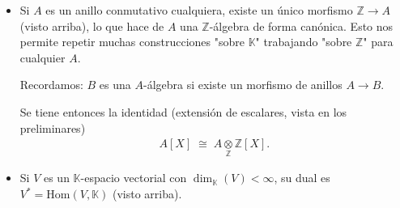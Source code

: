 \begin{ejemplo}
\begin{itemize}
        Tomemos ahora $X=\mathbb{N}$. Dentro de $\mathrm{Maps}(\mathbb{N},\mathbb{K})=\mathbb{K}^{\mathbb{N}}$ (todas las sucesiones) tenemos el subconjunto $\mathbb{K}^{(\mathbb{N})}$ de \textbf{soporte finito} (sucesiones casi nulas), que es un ideal de $\mathbb{K}^{\mathbb{N}}$ pero \emph{no} contiene a la unidad, así que como anillo se estudia aparte. Sobre las sucesiones (finitas o de soporte finito) de escalares podemos considerar dos productos distintos:
        \begin{itemize}
            \item el \textbf{producto de Cauchy} (el producto usual de series/polinomios de potencias),
            \begin{gather*}
                (a_n)_n * (b_n)_n = \Big(\sum_{k=0}^{n} a_k\, b_{n-k}\Big)_n,
            \end{gather*}
            \item el \textbf{producto de Hurwitz}, que incorpora coeficientes binomiales,
            \begin{gather*}
                (a_n)_n \cdot (b_n)_n = \Big(\sum_{k=0}^{n} \binom{n}{k}\, a_k\, b_{n-k}\Big)_n.
            \end{gather*}
        \end{itemize}
        (\emph{Corrección}: en el enunciado original aparecía $b_{n\cdot k}$, un error tipográfico; el índice correcto es $b_{n-k}$.) El producto de Hurwitz corresponde a la estructura de anillo en las series de potencias exponenciales (útil, por ejemplo, al trabajar con funciones generatrices exponenciales).

        \item Si $A$ es un anillo conmutativo cualquiera, existe un único morfismo $\mathbb{Z}\to A$ (visto arriba), lo que hace de $A$ una $\mathbb{Z}$-álgebra de forma canónica. Esto nos permite repetir muchas construcciones "sobre $\mathbb{K}$" trabajando "sobre $\mathbb{Z}$" para cualquier $A$.

        Recordamos: $B$ es una $A$-álgebra si existe un morfismo de anillos $A\to B$.

        Se tiene entonces la identidad (extensión de escalares, vista en los preliminares)
        \begin{gather*}
            A[X] \;\cong\; A\underset{\mathbb{Z}}{\otimes} \mathbb{Z}[X].
        \end{gather*}

        \item Si $V$ es un $\mathbb{K}$-espacio vectorial con $\dim_{\mathbb{K}}(V)<\infty$, su dual es $V^* = \mathrm{Hom}(V,\mathbb{K})$ (visto arriba).
    \end{itemize}
\end{ejemplo}

